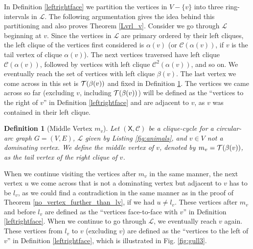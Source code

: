 \documentclass[10pt]{article}
\newtheorem{definition}[theorem]{Definition}
\newcommand{\q}[1]{``#1''}\newcommand{\fu}[1]{\mathcal{#1}}\newcommand{\mc}[1]{\mathsf{#1}}\newcommand{\ri}[1]{\mathscr{#1}}\newcommand{\co}[1]{\fu{C}({#1})}\newcommand{\lc}[1]{\alpha(#1)}\newcommand{\rc}[1]{\beta(#1)}\newcommand{\ema}[1]{\mathcal{#1}}\newcommand{\fe}[2]{\fu{F}(#1,#2)}\newcommand{\lv}[1]{l_{#1}}\newcommand{\rv}[1]{r_{#1}}\newcommand{\mv}[1]{m_{#1}}\newcommand{\lvv}{\lv{v}}
\newcommand{\mvv}{\mv{v}}
\begin{document}
In Definition \ref{leftrightface} we partition the vertices in $V-\{v\}$ into three 
ring-intervals in $\ri{L}$.
The following argumentation gives the idea behind this partitioning and also proves 
Theorem \ref{Lvrl_v}. Consider we go through $\ri{L}$ beginning at $v$.
Since the vertices in $\ri{L}$ are primary ordered by their left cliques, the left 
clique of the vertices first considered is $\lc{v}$ (or $\ri{C}(\lc{v})$, if $v$ is the 
tail vertex of clique $\lc{v}$).
The next vertices traversed have left clique $\ri{C}(\lc{v})$, followed by vertices with 
left clique $\ri{C}^2(\lc{v})$, and so on.
We eventually reach the set of vertices with left clique $\rc{v}$.
The last vertex we come across in this set is $\last{\rc{v}}$ and fixed in Definition \ref{de_m_v}.
The vertices we came across so far (excluding $v$, including $\last{\rc{v}}$) will be 
defined as the \q{vertices to the right of $v$} in Definition \ref{leftrightface} and are 
adjacent to $v$, as $v$ was contained in their left clique.

\begin{definition}[Middle Vertex $\mvv$]\label{de_m_v}
Let $(\mc{X},\ri{C})$ be a clique-cycle for a cir\-cular-arc graph $G=(V,E)$, $\ri{L}$ 
given by Listing \ref{fig:animals}, and $v\in V$ not a dominating vertex.
We define the \emph{middle vertex of $v$}, denoted by $\mvv=\last{\rc{v}}$,  
as the tail vertex of the right clique of $v$.
\end{definition}






When we continue visiting the vertices after $\mvv$ in the same manner, the next vertex $u$ we come across that is not a dominating vertex but adjacent to $v$ has to be $\lvv$, as we could find a contradiction in the same manner as 
in the proof of Theorem \ref{no_vertex_further_than_lv}, if we had $u\neq\lvv$.
These vertices after $\mvv$ and before $\lvv$ are defined as the \q{vertices face-to-face with $v$} 
in Definition \ref{leftrightface}. When we continue to go through $\ri{L}$, we eventually 
reach $v$ again. These vertices from $\lvv$ to $v$ (excluding $v$) are defined 
as the \q{vertices to the left of $v$} in Definition \ref{leftrightface}, which is illustrated in Fig. \ref{fig:gull3}.
\end{document}
